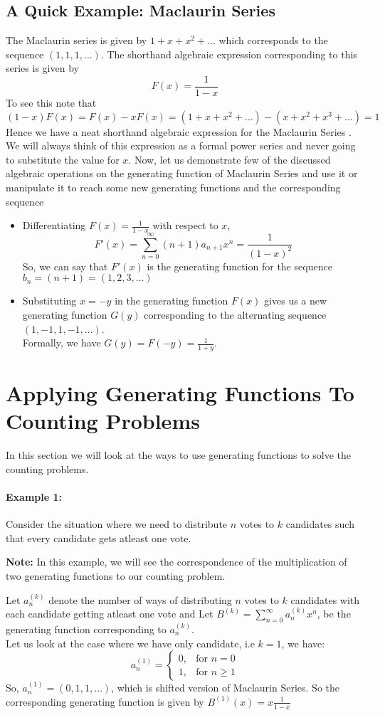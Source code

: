 \subsection{A Quick Example: Maclaurin Series}
The Maclaurin series is given by  $1+x+x^2+\dots$ which corresponds to the sequence $(1,1,1,\dots)$. The shorthand algebraic expression corresponding to this series is given by  $$F(x)=\frac{1}{1-x}$$  To see this note that 
 $$(1-x)F(x)=F(x)-xF(x)=(1+x+x^2+\dots)-(x+x^2+x^3+\dots)=1$$
  Hence we have a neat shorthand algebraic expression for the Maclaurin Series . We will always think of this expression  as a formal power series and never going to substitute the value for $x$.
Now, let us demonstrate few of the discussed algebraic operations on the generating function of Maclaurin Series and use it or manipulate it to reach some new generating functions and the corresponding sequence
\begin{itemize}
    \item Differentiating $F(x)=\frac{1}{1-x}$ with respect to $x$,
    $$F'(x)=\sum_{n=0}^{\infty}(n+1)a_{n+1}x^n=\frac{1}{(1-x)^2}$$
    So, we can say that $F'(x)$ is the generating function for the sequence $b_n=(n+1)=(1,2,3,\dots)$
    \item Substituting $x=-y$ in the generating function $F(x)$ gives us a new generating function $G(y)$ corresponding to the alternating sequence $(1,-1,1,-1,\dots)$.\\ Formally, we have $G(y)=F(-y)=\frac{1}{1+y}$.
\end{itemize}
\section{Applying Generating Functions To Counting Problems}
In this section we will look at  the ways to use generating functions to solve the counting problems.

\paragraph{Example 1:} Consider the situation where we need to distribute $n$ votes to $k$ candidates such that every candidate gets atleast one vote. 

\noindent \textbf{Note:}  In this example, we will see the correspondence of the multiplication of two generating functions to our counting problem.

\noindent Let $a_n^{(k)}$ denote the number of ways of distributing $n$ votes to $k$ candidates with each candidate getting atleast one vote and Let $B^{(k)}=\sum_{n=0}^{\infty}a_n^{(k)}x^n$, be the generating function corresponding to $a_n^{(k)}$.\\
Let us look at the case where we have only candidate, i.e $k=1$, we have:
\[
  a_n^{(1)} = 
  \begin{cases}
   0, & \text{for } n=0 \\
    1, & \text{for }n\ge 1
  \end{cases}
\]
So, $a_n^{(1)}=(0,1,1,\dots)$, which is shifted version of Maclaurin Series. So the corresponding generating function is given by $B^{(1)}(x)=x\frac{1}{1-x}$

